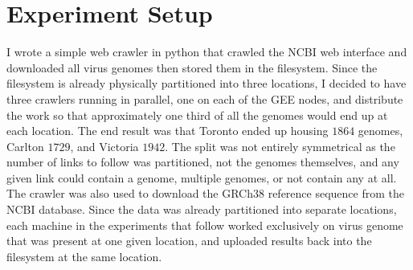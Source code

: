 
\section{Experiment Setup}

I wrote a simple web crawler in python that crawled the NCBI web interface and downloaded all virus genomes then stored them in the filesystem. Since the filesystem is already physically partitioned into three locations, I decided to have three crawlers running in parallel, one on each of the GEE nodes, and distribute the work so that approximately one third of all the genomes would end up at each location. The end result was that Toronto ended up housing $1864$ genomes, Carlton $1729$, and Victoria $1942$. The split was not entirely symmetrical as the number of links to follow was partitioned, not the genomes themselves, and any given link could contain a genome, multiple genomes, or not contain any at all. The crawler was also used to download the GRCh38 reference sequence from the NCBI database. Since the data was already partitioned into separate locations, each machine in the experiments that follow worked exclusively on virus genome that was present at one given location, and uploaded results back into the filesystem at the same location.